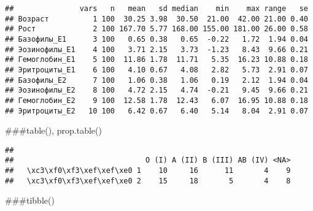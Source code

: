 \documentclass[
]{article}
\newenvironment{Shaded}{\begin{snugshade}}{\end{snugshade}}
\newcommand{\AttributeTok}[1]{\textcolor[rgb]{0.13,0.29,0.53}{#1}}
\newcommand{\FunctionTok}[1]{\textcolor[rgb]{0.13,0.29,0.53}{\textbf{#1}}}
\newcommand{\NormalTok}[1]{#1}
\newcommand{\OtherTok}[1]{\textcolor[rgb]{0.56,0.35,0.01}{#1}}
\newcommand{\SpecialCharTok}[1]{\textcolor[rgb]{0.81,0.36,0.00}{\textbf{#1}}}
\newcommand{\StringTok}[1]{\textcolor[rgb]{0.31,0.60,0.02}{#1}}
\begin{document}
\begin{verbatim}
##               vars   n   mean   sd median    min    max range   se
## Возраст          1 100  30.25 3.98  30.50  21.00  42.00 21.00 0.40
## Рост             2 100 167.70 5.77 168.00 155.00 181.00 26.00 0.58
## Базофилы_E1      3 100   0.65 0.38   0.65  -0.22   1.72  1.94 0.04
## Эозинофилы_E1    4 100   3.71 2.15   3.73  -1.23   8.43  9.66 0.21
## Гемоглобин_E1    5 100  11.86 1.78  11.71   5.35  16.23 10.88 0.18
## Эритроциты_E1    6 100   4.10 0.67   4.08   2.82   5.73  2.91 0.07
## Базофилы_E2      7 100   1.06 0.38   1.06   0.19   2.12  1.94 0.04
## Эозинофилы_E2    8 100   4.72 2.15   4.74  -0.21   9.45  9.66 0.21
## Гемоглобин_E2    9 100  12.58 1.78  12.43   6.07  16.95 10.88 0.18
## Эритроциты_E2   10 100   6.42 0.67   6.40   5.14   8.04  2.91 0.07
\end{verbatim}

\#\#\#table(), prop.table()

\begin{Shaded}
\end{Shaded}

\begin{verbatim}
##                             
##                              O (I) A (II) B (III) AB (IV) <NA>
##   \xc3\xf0\xf3\xef\xef\xe0 1    10     16      11       4    9
##   \xc3\xf0\xf3\xef\xef\xe0 2    15     18       5       4    8
\end{verbatim}

\#\#\#tibble()
\end{document}
